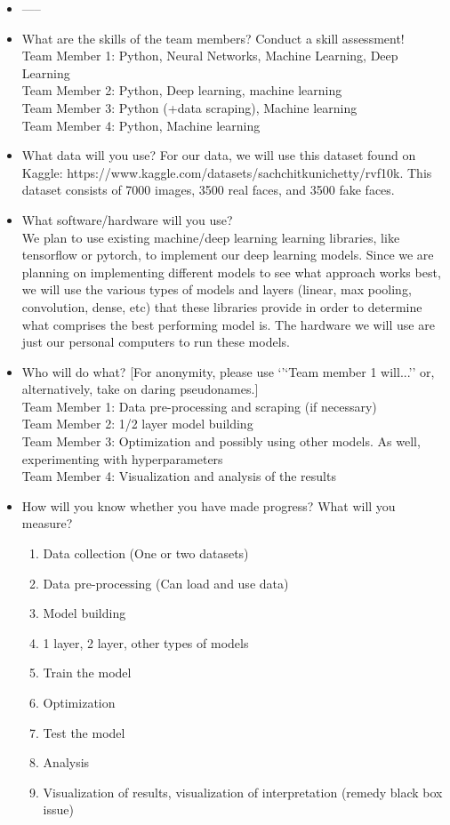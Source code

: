 \begin{itemize}
  \item -----
  \item What are the skills of the team members? Conduct a skill assessment! \\Team Member 1: Python, Neural Networks, Machine Learning, Deep Learning\\
Team Member 2: Python, Deep learning, machine learning\\
Team Member 3: Python (+data scraping), Machine learning\\
Team Member 4: Python, Machine learning\\

  \item What data will you use? For our data, we will use this dataset found on Kaggle: https://www.kaggle.com/datasets/sachchitkunichetty/rvf10k. This dataset consists of 7000 images, 3500 real faces, and 3500 fake faces.
\\
  \item What software/hardware will you use?\\We plan to use existing machine/deep learning learning libraries, like tensorflow or pytorch, to implement our deep learning models. Since we are planning on implementing different models to see what approach works best, we will use the various types of models and layers (linear, max pooling, convolution, dense, etc) that these libraries provide in order to determine what comprises the best performing model is. The hardware we will use are just our personal computers to run these models. 
\\

  \item Who will do what? [For anonymity, please use `'`Team member 1 will...'' or, alternatively, take on daring pseudonames.]
  \\ Team Member 1: Data pre-processing and scraping (if necessary)\\
Team Member 2: 1/2 layer model building \\
Team Member 3: Optimization and possibly using other models. As well, experimenting with hyperparameters \\
Team Member 4: Visualization and analysis of the results\\

  \item How will you know whether you have made progress? What will you measure?
  \begin{enumerate}\item Data collection (One or two datasets)
\item Data pre-processing (Can load and use data)
\item Model building
\item 1 layer, 2 layer, other types of models
\item Train the model
\item Optimization
\item Test the model
\item Analysis
\item Visualization of results, visualization of interpretation (remedy black box issue) 


\end{enumerate}
\end{itemize}
